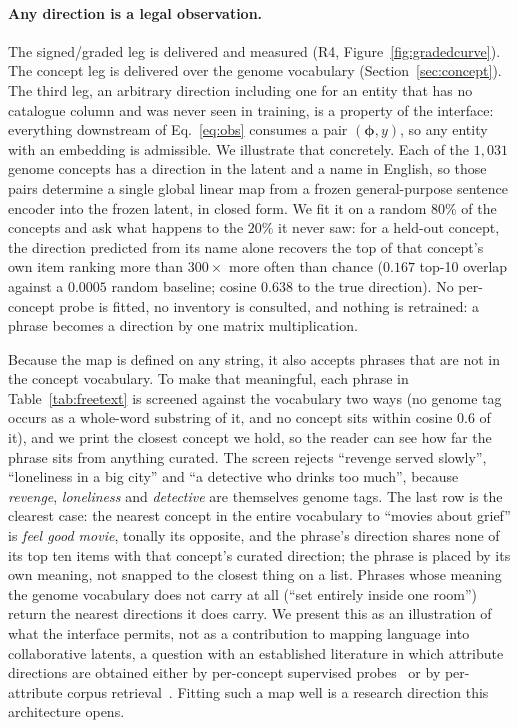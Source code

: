 \documentclass[manuscript,screen,review]{acmart}
\newcommand{\bphi}{\boldsymbol{\phi}}
\begin{document}
\paragraph{Any direction is a legal observation.} The signed/graded leg is delivered and measured (R4, Figure~\ref{fig:gradedcurve}). The concept leg is delivered over the genome vocabulary (Section~\ref{sec:concept}). The third leg, an arbitrary direction including one for an entity that has no catalogue column and was never seen in training, is a property of the interface: everything downstream of Eq.~\eqref{eq:obs} consumes a pair $(\bphi,y)$, so any entity with an embedding is admissible. We illustrate that concretely. Each of the $1{,}031$ genome concepts has a direction in the latent and a name in English, so those pairs determine a single global linear map from a frozen general-purpose sentence encoder into the frozen latent, in closed form. We fit it on a random $80\%$ of the concepts and ask what happens to the $20\%$ it never saw: for a held-out concept, the direction predicted from its name alone recovers the top of that concept's own item ranking more than $300\times$ more often than chance ($0.167$ top-10 overlap against a $0.0005$ random baseline; cosine $0.638$ to the true direction). No per-concept probe is fitted, no inventory is consulted, and nothing is retrained: a phrase becomes a direction by one matrix multiplication.

Because the map is defined on any string, it also accepts phrases that are not in the concept vocabulary. To make that meaningful, each phrase in Table~\ref{tab:freetext} is screened against the vocabulary two ways (no genome tag occurs as a whole-word substring of it, and no concept sits within cosine $0.6$ of it), and we print the closest concept we hold, so the reader can see how far the phrase sits from anything curated. The screen rejects ``revenge served slowly'', ``loneliness in a big city'' and ``a detective who drinks too much'', because \emph{revenge}, \emph{loneliness} and \emph{detective} are themselves genome tags. The last row is the clearest case: the nearest concept in the entire vocabulary to ``movies about grief'' is \emph{feel good movie}, tonally its opposite, and the phrase's direction shares none of its top ten items with that concept's curated direction; the phrase is placed by its own meaning, not snapped to the closest thing on a list. Phrases whose meaning the genome vocabulary does not carry at all (``set entirely inside one room'') return the nearest directions it does carry. We present this as an illustration of what the interface permits, not as a contribution to mapping language into collaborative latents, a question with an established literature in which attribute directions are obtained either by per-concept supervised probes~\citep{gopfert2024cav,biyik2023soft} or by per-attribute corpus retrieval~\citep{balog2021softattr}. Fitting such a map well is a research direction this architecture opens.
\end{document}
